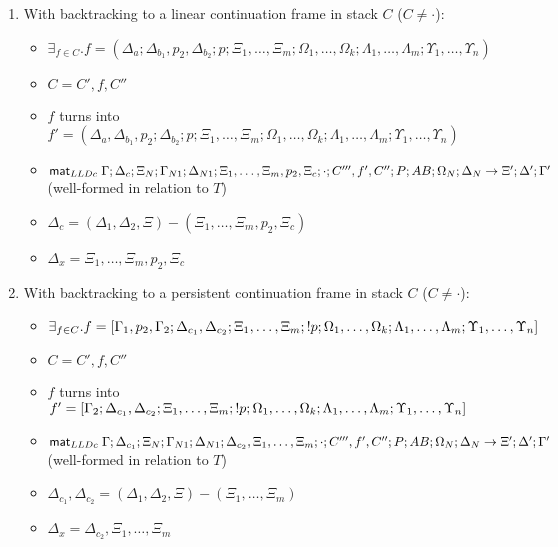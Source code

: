 {\begin{lemma}
\begin{enumerate}
\begin{enumerate}
         \item With backtracking to a linear continuation frame in stack $C$ ($C \neq \cdot$):
         \begin{itemize}
            \item $\exists_{f \in C}. f = (\Delta_a; \Delta_{b_1}, p_2,
                  \Delta_{b_2}; p; \Xi_1, \dotsc, \Xi_m; \Omega_1, \dotsc,
                  \Omega_k; \Lambda_1, \dotsc, \Lambda_m; \Upsilon_1, \dotsc,
                  \Upsilon_n)$
            \item $C = C', f, C''$
            \item $f$ turns into $f' = (\Delta_a, \Delta_{b_1}, p_2;
                  \Delta_{b_2}; p; \Xi_1, \dotsc, \Xi_m;
                  \Omega_1, \dotsc, \Omega_k; \Lambda_1, \dotsc, \Lambda_m;
                  \Upsilon_1, \dotsc, \Upsilon_n)$
            \item $\mathsf{mat}_{LLDc} \; \Gamma; \Delta_c; \Xi_N; \Gamma_{N1}; \Delta_{N1}; \Xi_1,
               \dotsc, \Xi_m, p_2, \Xi_c; \cdot; C''', f', C''; P;
               AB; \Omega_N; \Delta_N \rightarrow \Xi'; \Delta';
               \Gamma'$ (well-formed in relation to $T$)
            \item $\Delta_c = (\Delta_1, \Delta_2, \Xi) - (\Xi_1, \dotsc, \Xi_m,
                  p_2, \Xi_c)$
            \item $\Delta_x = \Xi_1, \dotsc, \Xi_m, p_2, \Xi_c$
         \end{itemize}
            
         \item With backtracking to a persistent continuation frame in stack $C$ ($C \neq \cdot$):

         \begin{itemize}
            \item $\exists_{f \in C}. f = [\Gamma_1, p_2, \Gamma_2; \Delta_{c_1},
               \Delta_{c_2}; \Xi_1, \dotsc, \Xi_m; {!} p; \Omega_1, \dotsc, \Omega_k;
               \Lambda_1, \dotsc, \Lambda_m; \Upsilon_1, \dotsc, \Upsilon_n]$
            \item $C = C', f, C''$
            \item $f$ turns into $f' = [\Gamma_2; \Delta_{c_1}, \Delta_{c_2};
               \Xi_1, \dotsc, \Xi_m; {!} p; \Omega_1, \dotsc, \Omega_k; \Lambda_1,
               \dotsc, \Lambda_m; \Upsilon_1, \dotsc, \Upsilon_n]$
            \item $\mathsf{mat}_{LLDc} \; \Gamma; \Delta_{c_1}; \Xi_N; \Gamma_{N1}; \Delta_{N1};
               \Delta_{c_2}, \Xi_1, \dotsc, \Xi_m; \cdot; C''', f', C''; P;
               AB; \Omega_N; \Delta_N \rightarrow \Xi'; \Delta'; \Gamma'$ (well-formed in relation to $T$)
            \item $\Delta_{c_1}, \Delta_{c_2} = (\Delta_1, \Delta_2, \Xi) - (\Xi_1, \dotsc, \Xi_m)$
            \item $\Delta_x = \Delta_{c_2}, \Xi_1, \dotsc, \Xi_m$
         \end{itemize}
            

\end{enumerate}
\end{enumerate}
\end{lemma}}
